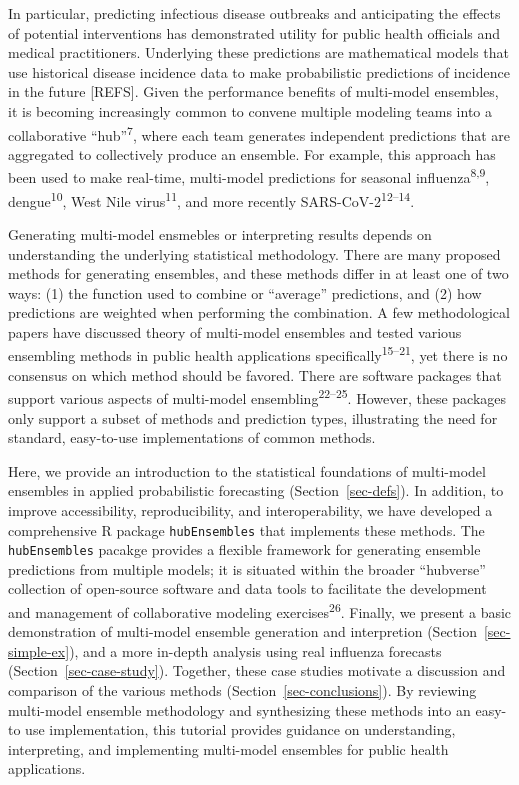 \documentclass[
  letterpaper,
  DIV=11,
  numbers=noendperiod]{scrartcl}
\begin{document}
In particular, predicting infectious disease outbreaks and anticipating
the effects of potential interventions has demonstrated utility for
public health officials and medical practitioners. Underlying these
predictions are mathematical models that use historical disease
incidence data to make probabilistic predictions of incidence in the
future {[}REFS{]}. Given the performance benefits of multi-model
ensembles, it is becoming increasingly common to convene multiple
modeling teams into a collaborative ``hub''\textsuperscript{7}, where
each team generates independent predictions that are aggregated to
collectively produce an ensemble. For example, this approach has been
used to make real-time, multi-model predictions for seasonal
influenza\textsuperscript{8,9}, dengue\textsuperscript{10}, West Nile
virus\textsuperscript{11}, and more recently
SARS-CoV-2\textsuperscript{12--14}.

Generating multi-model ensmebles or interpreting results depends on
understanding the underlying statistical methodology. There are many
proposed methods for generating ensembles, and these methods differ in
at least one of two ways: (1) the function used to combine or
``average'' predictions, and (2) how predictions are weighted when
performing the combination. A few methodological papers have discussed
theory of multi-model ensembles and tested various ensembling methods in
public health applications specifically\textsuperscript{15--21}, yet
there is no consensus on which method should be favored. There are
software packages that support various aspects of multi-model
ensembling\textsuperscript{22--25}. However, these packages only support
a subset of methods and prediction types, illustrating the need for
standard, easy-to-use implementations of common methods.

Here, we provide an introduction to the statistical foundations of
multi-model ensembles in applied probabilistic forecasting
(Section~\ref{sec-defs}). In addition, to improve accessibility,
reproducibility, and interoperability, we have developed a comprehensive
R package \texttt{hubEnsembles} that implements these methods. The
\texttt{hubEnsembles} pacakge provides a flexible framework for
generating ensemble predictions from multiple models; it is situated
within the broader ``hubverse'' collection of open-source software and
data tools to facilitate the development and management of collaborative
modeling exercises\textsuperscript{26}. Finally, we present a basic
demonstration of multi-model ensemble generation and interpretion
(Section~\ref{sec-simple-ex}), and a more in-depth analysis using real
influenza forecasts (Section~\ref{sec-case-study}). Together, these case
studies motivate a discussion and comparison of the various methods
(Section~\ref{sec-conclusions}). By reviewing multi-model ensemble
methodology and synthesizing these methods into an easy-to use
implementation, this tutorial provides guidance on understanding,
interpreting, and implementing multi-model ensembles for public health
applications.
\end{document}
